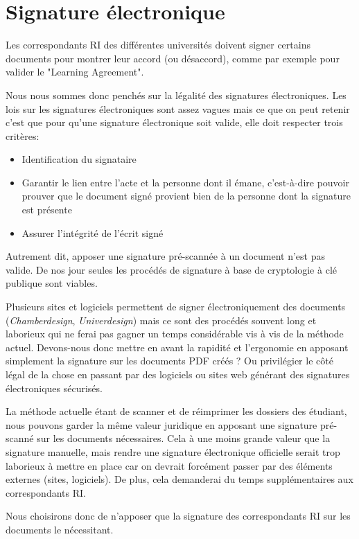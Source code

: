 \section{Signature électronique}
Les correspondants RI des différentes universités doivent signer certains documents pour montrer leur accord (ou désaccord), comme par exemple pour valider le "Learning Agreement".

Nous nous sommes donc penchés sur la légalité des signatures électroniques.
Les lois sur les signatures électroniques sont assez vagues mais ce que on peut retenir c'est que pour qu'une signature électronique soit valide, elle doit respecter trois critères:
\begin{itemize}
\item Identification du signataire
\item Garantir le lien entre l'acte et la personne dont il émane, c'est-à-dire pouvoir prouver que le document signé provient bien de la personne dont la signature est présente
\item Assurer l'intégrité de l'écrit signé
\end{itemize}
Autrement dit, apposer une signature pré-scannée à un document n'est pas valide.
De nos jour seules les procédés de signature à base de cryptologie à clé publique sont viables.

Plusieurs sites et logiciels permettent de signer électroniquement des documents (\textit{Chamberdesign}, \textit{Univerdesign}) mais ce sont des procédés souvent long et laborieux qui ne ferai pas gagner un temps considérable vis à vis de la méthode actuel.
Devons-nous donc mettre en avant la rapidité et l'ergonomie en apposant simplement la signature sur les documents PDF créés ? Ou privilégier le côté légal de la chose en passant par des logiciels ou sites web générant des signatures électroniques sécurisés.

La méthode actuelle étant de scanner et de réimprimer les dossiers des étudiant, nous pouvons garder la même valeur juridique en apposant une signature pré-scanné sur les documents nécessaires. Cela à une moins grande valeur que la signature manuelle, mais rendre une signature électronique officielle serait trop laborieux à mettre en place car on devrait forcément passer par des éléments externes (sites, logiciels). De plus, cela demanderai du temps supplémentaires aux correspondants RI.

Nous choisirons donc de n'apposer que la signature des correspondants RI sur les documents le nécessitant.
